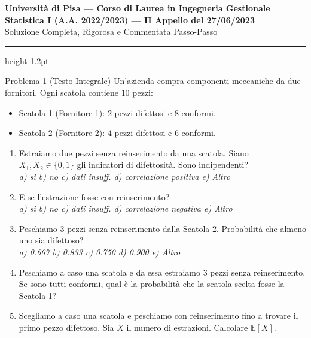 \documentclass[11pt,a4paper]{article}
\newcommand{\EE}{\mathbb{E}}
\begin{document}
\begin{center}
    {\LARGE\bfseries\color{navyblue} Università di Pisa --- Corso di Laurea in Ingegneria Gestionale}\\[0.4em]
    {\Large\bfseries Statistica I (A.A. 2022/2023) --- II Appello del 27/06/2023}\\[0.3em]
    {\large\textsf{Soluzione Completa, Rigorosa e Commentata Passo-Passo}}
\end{center}
\vspace{0.5em}
\hrule height 1.2pt
\vspace{1.5em}

\begin{problemabox}{Problema 1 (Testo Integrale)}
Un'azienda compra componenti meccaniche da due fornitori. Ogni scatola contiene $10$ pezzi:
\begin{itemize}
    \item Scatola 1 (Fornitore 1): $2$ pezzi difettosi e $8$ conformi.
    \item Scatola 2 (Fornitore 2): $4$ pezzi difettosi e $6$ conformi.
\end{itemize}
\begin{enumerate}[label=(\alph*)]
    \item Estraiamo due pezzi senza reinserimento da una scatola. Siano $X_1, X_2 \in \{0, 1\}$ gli indicatori di difettosità. Sono indipendenti?\\
    \emph{a) sì \quad b) no \quad c) dati insuff. \quad d) correlazione positiva \quad e) Altro}
    \item E se l'estrazione fosse con reinserimento?\\
    \emph{a) sì \quad b) no \quad c) dati insuff. \quad d) correlazione negativa \quad e) Altro}
    \item Peschiamo $3$ pezzi senza reinserimento dalla Scatola 2. Probabilità che almeno uno sia difettoso?\\
    \emph{a) 0.667 \quad b) 0.833 \quad c) 0.750 \quad d) 0.900 \quad e) Altro}
    \item Peschiamo a caso una scatola e da essa estraiamo 3 pezzi senza reinserimento. Se sono tutti conformi, qual è la probabilità che la scatola scelta fosse la Scatola 1?
    \item Scegliamo a caso una scatola e peschiamo con reinserimento fino a trovare il primo pezzo difettoso. Sia $X$ il numero di estrazioni. Calcolare $\EE[X]$.
\end{enumerate}
\end{problemabox}
\end{document}
